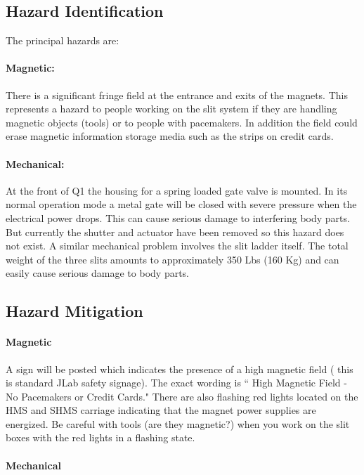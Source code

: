 {\subsection{Hazard Identification}

The principal hazards are:
\paragraph{Magnetic:} There is a significant fringe field at
the entrance and exits of the magnets. This represents a hazard
to people working on the slit system if they are handling magnetic
objects (tools) or to people with pacemakers. In addition the field could erase magnetic
information storage media such as the strips on credit cards.
\paragraph{Mechanical:} At the front of Q1 the housing for a spring loaded gate valve is
mounted. In its normal operation mode a metal gate will be closed with
severe pressure when the electrical power drops. This can cause serious
damage to interfering body parts.  But currently the shutter and
actuator have been removed so this hazard does not exist.
A similar mechanical problem involves the slit ladder itself. The total weight of
the three slits amounts to approximately 350 Lbs (160 Kg) and can easily
cause serious damage to body parts.

\subsection{Hazard Mitigation}

\paragraph{Magnetic}

A sign will be posted which indicates the presence of a high magnetic
field ( this is standard JLab safety signage). The exact wording is
`` High Magnetic Field - No Pacemakers or Credit Cards." There are also
flashing red lights located on the HMS and SHMS carriage indicating that the
magnet power supplies are energized. Be careful with tools (are they magnetic?)
when you work on the slit boxes with the red lights in a flashing state.

\paragraph{Mechanical}

}
